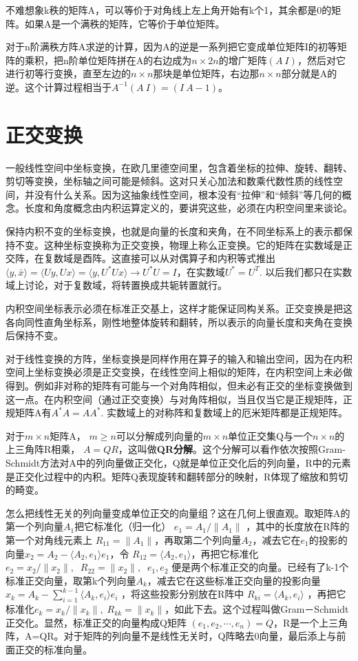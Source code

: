 不难想象k秩的矩阵A，可以等价于对角线上左上角开始有k个1，其余都是0的矩阵。如果A是一个满秩的矩阵，它等价于单位矩阵。

对于n阶满秩方阵A求逆的计算，因为A的逆是一系列把它变成单位矩阵I的初等矩阵的乘积，把n阶单位矩阵拼在A的右边成为$ n\times 2 n$的增广矩阵$ (A\ I)$，然后对它进行初等行变换，直至左边的$ n\times n $那块是单位矩阵，右边那$ n\times n $部分就是A的逆。这个计算过程相当于$ A^{-1}(A\ I)=(I\ A-1) $。

\section{正交变换}

一般线性空间中坐标变换，在欧几里德空间里，包含着坐标的拉伸、旋转、翻转、剪切等变换，坐标轴之间可能是倾斜。这对只关心加法和数乘代数性质的线性空间，并没有什么关系。因为这抽象线性空间，根本没有``拉伸''和``倾斜''等几何的概念。长度和角度概念由内积运算定义的，要讲究这些，必须在内积空间里来谈论。

保持内积不变的坐标变换，也就是向量的长度和夹角，在不同坐标系上的表示都保持不变。这种坐标变换称为正交变换，物理上称么正变换。它的矩阵在实数域是正交阵，在复数域是酉阵。这直接可以从对偶算子和内积等式推出$ \langle y, \bar{x}\rangle=\langle Uy, Ux\rangle=\langle y,U^{*} Ux\rangle \rightarrow U^{*}U=I $，在实数域$ U^{*} = U^{T}  $. 以后我们都只在实数域上讨论，对于复数域，将转置换成共轭转置就行。

内积空间坐标表示必须在标准正交基上，这样才能保证同构关系。正交变换是把这各向同性直角坐标系，刚性地整体旋转和翻转，所以表示的向量长度和夹角在变换后保持不变。

对于线性变换的方阵，坐标变换是同样作用在算子的输入和输出空间，因为在内积空间上坐标变换必须是正交变换，在线性空间上相似的矩阵，在内积空间上未必做得到。例如非对称的矩阵有可能与一个对角阵相似，但未必有正交的坐标变换做到这一点。在内积空间（通过正交变换）与对角阵相似，当且仅当它是正规矩阵，正规矩阵A有$ A^{*}A  = AA^{*} $. 实数域上的对称阵和复数域上的厄米矩阵都是正规矩阵。

对于$ m\times n $矩阵A， $ m\ge n $可以分解成列向量的$ m\times n $单位正交集Q与一个$ n\times n $的上三角阵R相乘， $ A=QR $，这叫做\textbf{QR分解}。这个分解可以看作依次按照Gram-Schmidt方法对A中的列向量做正交化，Q就是单位正交化后的列向量，R中的元素是正交化过程中的内积。矩阵Q表现旋转和翻转部分的映射，R体现了缩放和剪切的畸变。

怎么把线性无关的列向量变成单位正交的向量组？这在几何上很直观。取矩阵A的第一个列向量$ A_1 $把它标准化（归一化） $ e_1 = A_1/\|A_1\| $ ，其中的长度放在R阵的第一个对角线元素上 $ R_{11}=\|A_1\| $，再取第二个列向量$  A_2  $，减去它在$ e_1 $的投影的向量$ x_2 = A_2 - \langle A_2, e_1 \rangle e_1 $，令 $ R_{12}=\langle A_2, e_1 \rangle $，再把它标准化$ e_2 = x_2/\|x_2\| ,\;\;R_{22}=\|x_2\|,\;\;e_1, e_2 $ 便是两个标准正交的向量。已经有了k-1个标准正交向量，取第k个列向量$ A_k $，减去它在这些标准正交向量的投影向量 $ x_{k} = A_{k} - \sum_{i=1}^{k-1} \langle A_{k}, e_i \rangle e_i $ ，将这些投影分别放在R阵中 $ R_{ki}= \langle A_k, e_i \rangle $ ，再把它标准化$ e_k = x_k/\|x_k\|, \; R_{kk}= \|x_k\| $，如此下去。这个过程叫做Gram－Schmidt正交化。显然，标准正交的向量构成Q矩阵 $ (e_1, e_2,\cdots ,e_n)=Q $，R是一个上三角阵，A=QR。对于矩阵的列向量不是线性无关时，Q阵略去0向量，最后添上与前面正交的标准向量。

